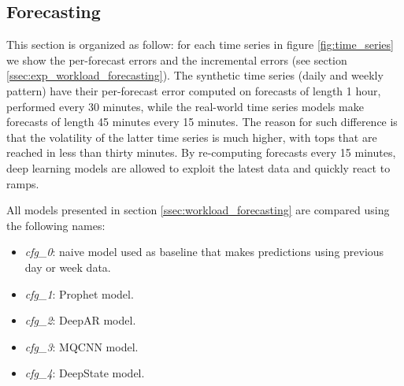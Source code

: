 \documentclass[a4paper, 12pt]{article} %
\begin{document}
	
	
	\clearpage
	\subsection{Forecasting} \label{ssec:results_forecasting}
	
	This section is organized as follow: for each time series in figure \ref{fig:time_series} we show the per-forecast errors and the incremental errors (see section \ref{ssec:exp_workload_forecasting}). 
	The synthetic time series (daily and weekly pattern) have their per-forecast error computed on forecasts of length 1 hour, performed every 30 minutes, while the real-world time series models make forecasts of length 45 minutes every 15 minutes. The reason for such difference is that the volatility of the latter time series is much higher, with tops that are reached in less than thirty minutes. By re-computing forecasts every 15 minutes, deep learning models are allowed to exploit the latest data and quickly react to ramps.
	
	All models presented in section \ref{ssec:workload_forecasting} are compared using the following names:
	\begin{itemize}
		\item \textit{cfg\_0}: naive model used as baseline that makes predictions using previous day or week data.
		\item \textit{cfg\_1}: Prophet model.
		\item \textit{cfg\_2}: DeepAR model.
		\item \textit{cfg\_3}: MQCNN model.
		\item \textit{cfg\_4}: DeepState model.
	\end{itemize}
	
\end{document}
